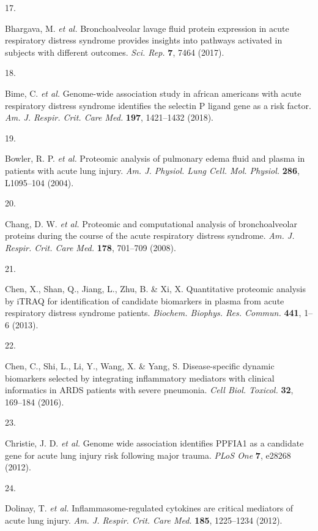 \documentclass[
  11,
  a4paper,
]{article}
\newlength{\cslhangindent}
\newlength{\csllabelwidth}
\newlength{\cslentryspacingunit} %
\newenvironment{CSLReferences}[2] %
 {%
  \setlength{\parindent}{0pt}
  \ifodd #1
  \let\oldpar\par
  \def\par{\hangindent=\cslhangindent\oldpar}
  \fi
  \setlength{\parskip}{#2\cslentryspacingunit}
 }%
 {}
\newcommand{\CSLLeftMargin}[1]{\parbox[t]{\csllabelwidth}{#1}}
\newcommand{\CSLRightInline}[1]{\parbox[t]{\linewidth - \csllabelwidth}{#1}\break}
\begin{document}
\begin{CSLReferences}{0}{0}
\leavevmode{}%
\CSLLeftMargin{17. }%
\CSLRightInline{Bhargava, M. \emph{et al.} Bronchoalveolar lavage fluid
protein expression in acute respiratory distress syndrome provides
insights into pathways activated in subjects with different outcomes.
\emph{Sci. Rep.} \textbf{7}, 7464 (2017).}

\leavevmode{}%
\CSLLeftMargin{18. }%
\CSLRightInline{Bime, C. \emph{et al.} Genome-wide association study in
african americans with acute respiratory distress syndrome identifies
the selectin {P} ligand gene as a risk factor. \emph{Am. J. Respir.
Crit. Care Med.} \textbf{197}, 1421--1432 (2018).}

\leavevmode{}%
\CSLLeftMargin{19. }%
\CSLRightInline{Bowler, R. P. \emph{et al.} Proteomic analysis of
pulmonary edema fluid and plasma in patients with acute lung injury.
\emph{Am. J. Physiol. Lung Cell. Mol. Physiol.} \textbf{286}, L1095--104
(2004).}

\leavevmode{}%
\CSLLeftMargin{20. }%
\CSLRightInline{Chang, D. W. \emph{et al.} Proteomic and computational
analysis of bronchoalveolar proteins during the course of the acute
respiratory distress syndrome. \emph{Am. J. Respir. Crit. Care Med.}
\textbf{178}, 701--709 (2008).}

\leavevmode{}%
\CSLLeftMargin{21. }%
\CSLRightInline{Chen, X., Shan, Q., Jiang, L., Zhu, B. \& Xi, X.
Quantitative proteomic analysis by {iTRAQ} for identification of
candidate biomarkers in plasma from acute respiratory distress syndrome
patients. \emph{Biochem. Biophys. Res. Commun.} \textbf{441}, 1--6
(2013).}

\leavevmode{}%
\CSLLeftMargin{22. }%
\CSLRightInline{Chen, C., Shi, L., Li, Y., Wang, X. \& Yang, S.
Disease-specific dynamic biomarkers selected by integrating inflammatory
mediators with clinical informatics in {ARDS} patients with severe
pneumonia. \emph{Cell Biol. Toxicol.} \textbf{32}, 169--184 (2016).}

\leavevmode{}%
\CSLLeftMargin{23. }%
\CSLRightInline{Christie, J. D. \emph{et al.} Genome wide association
identifies {PPFIA1} as a candidate gene for acute lung injury risk
following major trauma. \emph{PLoS One} \textbf{7}, e28268 (2012).}

\leavevmode{}%
\CSLLeftMargin{24. }%
\CSLRightInline{Dolinay, T. \emph{et al.} Inflammasome-regulated
cytokines are critical mediators of acute lung injury. \emph{Am. J.
Respir. Crit. Care Med.} \textbf{185}, 1225--1234 (2012).}


\end{CSLReferences}
\end{document}
